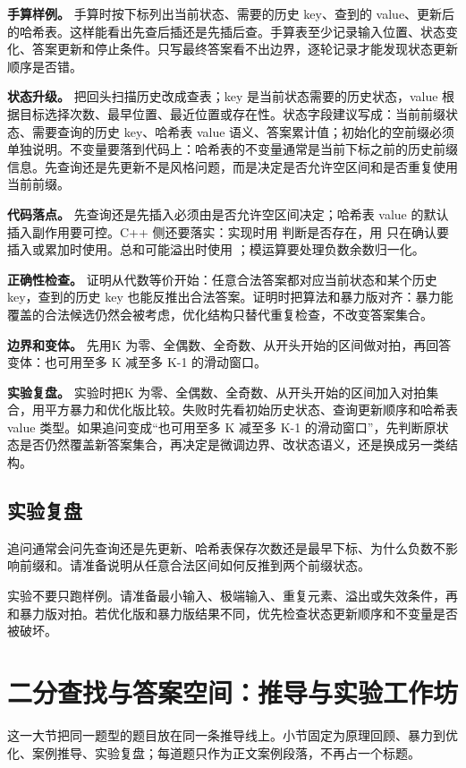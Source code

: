 \textbf{手算样例。} 手算时按下标列出当前状态、需要的历史 key、查到的 value、更新后的哈希表。这样能看出先查后插还是先插后查。手算表至少记录输入位置、状态变化、答案更新和停止条件。只写最终答案看不出边界，逐轮记录才能发现状态更新顺序是否错。

\textbf{状态升级。} 把回头扫描历史改成查表；key 是当前状态需要的历史状态，value 根据目标选择次数、最早位置、最近位置或存在性。状态字段建议写成：当前前缀状态、需要查询的历史 key、哈希表 value 语义、答案累计值；初始化的空前缀必须单独说明。不变量要落到代码上：哈希表的不变量通常是当前下标之前的历史前缀信息。先查询还是先更新不是风格问题，而是决定是否允许空区间和是否重复使用当前前缀。

\textbf{代码落点。} 先查询还是先插入必须由是否允许空区间决定；哈希表 value 的默认插入副作用要可控。C++ 侧还要落实：实现时用  判断是否存在，用  只在确认要插入或累加时使用。总和可能溢出时使用 ；模运算要处理负数余数归一化。

\textbf{正确性检查。} 证明从代数等价开始：任意合法答案都对应当前状态和某个历史 key，查到的历史 key 也能反推出合法答案。证明时把算法和暴力版对齐：暴力能覆盖的合法候选仍然会被考虑，优化结构只替代重复检查，不改变答案集合。

\textbf{边界和变体。} 先用K 为零、全偶数、全奇数、从开头开始的区间做对拍，再回答变体：也可用至多 K 减至多 K-1 的滑动窗口。

\textbf{实验复盘。} 实验时把K 为零、全偶数、全奇数、从开头开始的区间加入对拍集合，用平方暴力和优化版比较。失败时先看初始历史状态、查询更新顺序和哈希表 value 类型。如果追问变成“也可用至多 K 减至多 K-1 的滑动窗口”，先判断原状态是否仍然覆盖新答案集合，再决定是微调边界、改状态语义，还是换成另一类结构。

\subsection{实验复盘}

追问通常会问先查询还是先更新、哈希表保存次数还是最早下标、为什么负数不影响前缀和。请准备说明从任意合法区间如何反推到两个前缀状态。

实验不要只跑样例。请准备最小输入、极端输入、重复元素、溢出或失效条件，再和暴力版对拍。若优化版和暴力版结果不同，优先检查状态更新顺序和不变量是否被破坏。

\section{二分查找与答案空间：推导与实验工作坊}
这一大节把同一题型的题目放在同一条推导线上。小节固定为原理回顾、暴力到优化、案例推导、实验复盘；每道题只作为正文案例段落，不再占一个标题。

